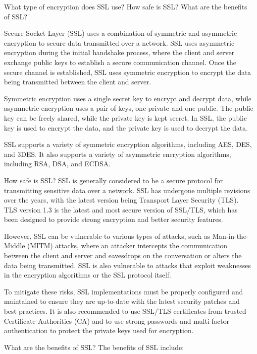 \documentclass[11pt]{article}
\begin{document}
\begin{enumerate}
    What type of encryption does SSL use?
    How safe is SSL?
    What are the benefits of SSL?

    Secure Socket Layer (SSL) uses a combination of symmetric and asymmetric encryption to secure data transmitted over a network. SSL uses asymmetric encryption during the initial handshake process, where the client and server exchange public keys to establish a secure communication channel. Once the secure channel is established, SSL uses symmetric encryption to encrypt the data being transmitted between the client and server.

Symmetric encryption uses a single secret key to encrypt and decrypt data, while asymmetric encryption uses a pair of keys, one private and one public. The public key can be freely shared, while the private key is kept secret. In SSL, the public key is used to encrypt the data, and the private key is used to decrypt the data.

SSL supports a variety of symmetric encryption algorithms, including AES, DES, and 3DES. It also supports a variety of asymmetric encryption algorithms, including RSA, DSA, and ECDSA.

How safe is SSL?
SSL is generally considered to be a secure protocol for transmitting sensitive data over a network. SSL has undergone multiple revisions over the years, with the latest version being Transport Layer Security (TLS). TLS version 1.3 is the latest and most secure version of SSL/TLS, which has been designed to provide strong encryption and better security features.

However, SSL can be vulnerable to various types of attacks, such as Man-in-the-Middle (MITM) attacks, where an attacker intercepts the communication between the client and server and eavesdrops on the conversation or alters the data being transmitted. SSL is also vulnerable to attacks that exploit weaknesses in the encryption algorithms or the SSL protocol itself.

To mitigate these risks, SSL implementations must be properly configured and maintained to ensure they are up-to-date with the latest security patches and best practices. It is also recommended to use SSL/TLS certificates from trusted Certificate Authorities (CA) and to use strong passwords and multi-factor authentication to protect the private keys used for encryption.

What are the benefits of SSL?
The benefits of SSL include:


\end{enumerate}
\end{document}

